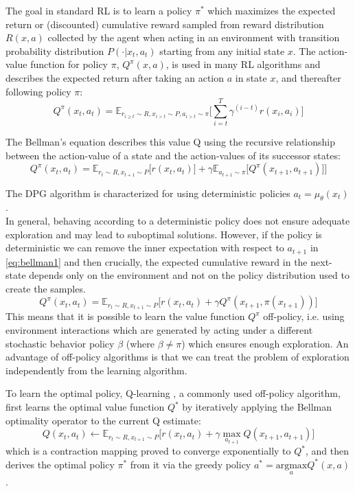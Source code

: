 The goal in standard RL is to learn a policy $\pi^*$ which maximizes the expected return or (discounted) cumulative
reward sampled from reward distribution $R(x,a)$ collected by the agent when acting in 
an environment with transition probability distribution $P(\cdot| x_{t},a_t)$ starting
from any initial state $x$.
The action-value function for policy $\pi$, $Q^\pi(x,a)$, is used in many RL algorithms and describes the expected return after taking
an action $a$ in state $x$, and thereafter following policy $\pi$:
\begin{equation}
    Q^\pi(x_t,a_t) = \mathbb E_{r_{i\geq t}\sim R,x_{i>t} \sim P, a_{i>t}\sim \pi}\Big[  \sum_{i=t}^T \gamma^{(i-t)}r(x_i,a_i) \Big]
\end{equation}

The Bellman's equation describes this value Q using the 
recursive relationship between the action-value of a state and the action-values of its
successor states:
\begin{equation}
    Q^\pi(x_t,a_t) = \mathbb E_{r_t\sim R,x_{t+1} \sim P}\Big[ r(x_t,a_t)] + \gamma \mathbb E_{a_{t+1}\sim \pi}\big[Q^\pi(x_{t+1},a_{t+1})\big]\Big] \label{eq:bellman1}
\end{equation}

The DPG algorithm \citep{silver2014b} is characterized for using deterministic policies $a_t=\mu_{\theta}(x_t)$.\\
In general, behaving according to a deterministic policy does not ensure adequate exploration
and may lead to suboptimal solutions. 
However, if the policy is deterministic we can remove the inner expectation with respect 
to $a_{t+1}$ in \ref{eq:bellman1} and then crucially, the expected cumulative reward in the next-state 
depends only on the environment and not on the policy distribution used to create the samples.
\begin{equation}
    Q^\pi(x_t,a_t) = \mathbb E_{r_t \sim R,x_{t+1} \sim P}\Big[ r(x_t,a_t) + \gamma Q^\pi(x_{t+1},\pi(x_{t+1}))\Big]
\end{equation}
\label{par:offpolicy}
This means that it is possible to learn the value function
$Q^\pi$ off-policy, i.e. using environment interactions which are generated by acting
under a different stochastic
behavior policy $\beta$ (where $\beta \neq \pi$) which ensures enough exploration.
An advantage of off-policy algorithms is that we can treat the problem of exploration
independently from the learning algorithm.

To learn the optimal policy, Q-learning \cite{Watkins1992}, a commonly used off-policy algorithm, first learns the optimal 
value function $Q^*$ by iteratively applying the Bellman optimality operator to the current Q estimate:
\begin{equation}
    Q(x_t,a_t) \leftarrow \mathbb E_{r_t \sim R,x_{t+1} \sim P}\Big[ r(x_t,a_t) + \gamma \underset{a_{t+1}} \max Q(x_{t+1},a_{t+1})\Big]
\end{equation}
which is a contraction mapping proved to converge exponentially to $Q^*$, and then
derives the optimal policy $\pi^*$ from it via the greedy policy $a^*=\underset{a}{\text{argmax}} Q^*(x,a)$.


